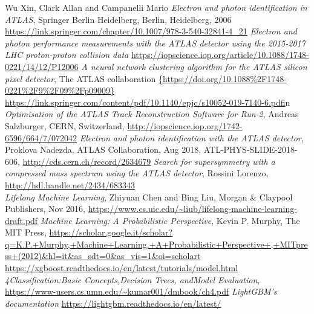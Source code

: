 \documentclass[a4paper, oneside]{book}
\begin{document}
\begin{thebibliography}{32}
			 Wu Xin, Clark Allan and Campanelli Mario \textit{Electron and photon identification in ATLAS}, Springer Berlin Heidelberg, Berlin, Heidelberg, 2006
			\url{https://link.springer.com/chapter/10.1007/978-3-540-32841-4_21} 
			\textit{Electron and photon performance measurements with the {ATLAS} detector using the 2015-2017 {LHC} proton-proton collision data}
			\url{https://iopscience.iop.org/article/10.1088/1748-0221/14/12/P12006}
			 \textit{A neural network clustering algorithm for the ATLAS silicon pixel detector}, The ATLAS collaboration
			\url{{https://doi.org/10.1088%2F1748-0221%2F9%2F09%2Fp09009}}
			\url{https://link.springer.com/content/pdf/10.1140/epjc/s10052-019-7140-6.pdf}in
			 \textit{Optimisation of the ATLAS Track Reconstruction Software for Run-2}, Andreas Salzburger, CERN, Switzerland, \url{http://iopscience.iop.org/1742-6596/664/7/072042}
			 \textit{Electron and photon identification with the ATLAS detector}, Proklova Nadezda, ATLAS Collaboration, Aug 2018, ATL-PHYS-SLIDE-2018-606, \url{http://cds.cern.ch/record/2634679}
			 \textit{Search for supersymmetry with a compressed mass spectrum using the ATLAS detector}, Rossini Lorenzo, \url{http://hdl.handle.net/2434/683343 }\\
			 \textit{Lifelong Machine Learning}, Zhiyuan Chen and Bing Liu, Morgan \& Claypool Publishers, Nov 2016, \url{https://www.cs.uic.edu/~liub/lifelong-machine-learning-draft.pdf}
			 \textit{Machine Learning: A Probabilistic Perspective}, Kevin P. Murphy, The MIT Press, \url{https://scholar.google.it/scholar?q=K.P.+Murphy,+Machine+Learning.+A+Probabilistic+Perspective+,+MITpress+(2012)&hl=it&as_sdt=0&as_vis=1&oi=scholart}
			 \url{https://xgboost.readthedocs.io/en/latest/tutorials/model.html}
			 \textit{4Classification:Basic Concepts,Decision Trees, andModel Evaluation}, \url{https://www-users.cs.umn.edu/~kumar001/dmbook/ch4.pdf}
			 \textit{LightGBM’s documentation} 
			\url{https://lightgbm.readthedocs.io/en/latest/}
			

\end{thebibliography}
\end{document}
